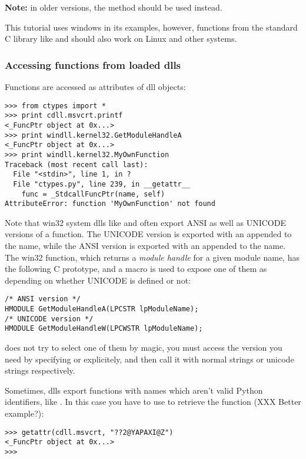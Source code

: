 \textbf{Note:} in older versions, the  method should be used
instead.

This tutorial uses windows in its examples, however, functions from
the standard C library like  and  should also work
on Linux and other systems.


\subsubsection{Accessing functions from loaded dlls\label{ctypes-accessing-functions-from-loaded-dlls}}

Functions are accessed as attributes of dll objects:
\begin{verbatim}
>>> from ctypes import *
>>> print cdll.msvcrt.printf
<_FuncPtr object at 0x...>
>>> print windll.kernel32.GetModuleHandleA
<_FuncPtr object at 0x...>
>>> print windll.kernel32.MyOwnFunction
Traceback (most recent call last):
  File "<stdin>", line 1, in ?
  File "ctypes.py", line 239, in __getattr__
    func = _StdcallFuncPtr(name, self)
AttributeError: function 'MyOwnFunction' not found
\end{verbatim}

Note that win32 system dlls like  and  often
export ANSI as well as UNICODE versions of a function. The UNICODE
version is exported with an  appended to the name, while the ANSI
version is exported with an  appended to the name. The win32
 function, which returns a \emph{module handle} for a
given module name, has the following C prototype, and a macro is used
to expose one of them as  depending on whether
UNICODE is defined or not:
\begin{verbatim}
/* ANSI version */
HMODULE GetModuleHandleA(LPCSTR lpModuleName);
/* UNICODE version */
HMODULE GetModuleHandleW(LPCWSTR lpModuleName);
\end{verbatim}

 does not try to select one of them by magic, you must
access the version you need by specifying  or
 explicitely, and then call it with normal strings
or unicode strings respectively.

Sometimes, dlls export functions with names which aren't valid Python
identifiers, like . In this case you have to use
 to retrieve the function (XXX Better example?):
\begin{verbatim}
>>> getattr(cdll.msvcrt, "??2@YAPAXI@Z")
<_FuncPtr object at 0x...>
>>>
\end{verbatim}


